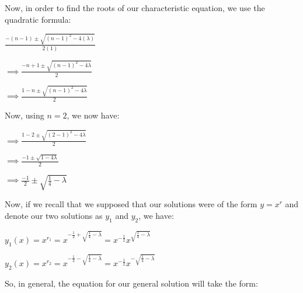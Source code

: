 \documentclass[executivepaper]{article}
\begin{document}
\begin{flushleft}
Now, in order to find the roots of our characteristic equation, we use the quadratic formula:

\begin{center}

$\frac{-(n-1) \pm \sqrt{(n-1)^2-4(\lambda)}}{2(1)}$

\hspace{1mm}

$\implies \frac{-n+1 \pm \sqrt{(n-1)^2-4 \lambda}}{2}$

\hspace{1mm}

$\implies \frac{1-n \pm \sqrt{(n-1)^2-4 \lambda}}{2}$

\vspace{3mm}

Now, using $n=2$, we now have:

\vspace{3mm}

$\implies \frac{1-2 \pm \sqrt{(2-1)^2-4 \lambda}}{2}$

\hspace{1mm}

$\implies \frac{-1 \pm \sqrt{1-4 \lambda}}{2}$

\hspace{1mm}

$\implies \frac{-1}{2} \pm \sqrt{\frac{1}{4}-\lambda}$

\end{center}

Now, if we recall that we supposed that our solutions were of the form $y=x^r$ and denote our two solutions as $y_{1}$ and $y_{2}$, we have: 

\begin{center}

$y_{1}(x)=x^{r_{1}}=x^{-\frac{1}{2}+\sqrt{\frac{1}{4}-\lambda}}=x^{-\frac{1}{2}}x^{\sqrt{\frac{1}{4}-\lambda}}$

\hspace{1mm}

$y_{2}(x)=x^{r_{2}}=x^{-\frac{1}{2}-\sqrt{\frac{1}{4}-\lambda}}=x^{-\frac{1}{2}}x^{-\sqrt{\frac{1}{4}-\lambda}}$

\end{center}

\pagebreak

\vspace*{-40mm}

So, in general, the equation for our general solution will take the form:

\begin{center}


\end{center}
\end{flushleft}
\end{document}
